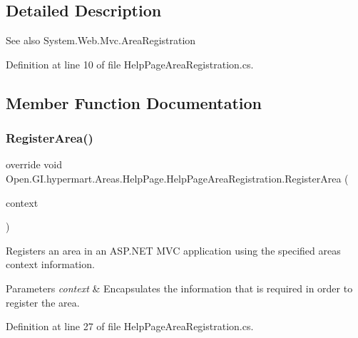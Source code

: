 \subsection{Detailed Description}


\begin{DoxySeeAlso}{See also}
System.\+Web.\+Mvc.\+Area\+Registration


\end{DoxySeeAlso}


Definition at line 10 of file Help\+Page\+Area\+Registration.\+cs.



\subsection{Member Function Documentation}
\mbox{\label{class_open_1_1_g_i_1_1hypermart_1_1_areas_1_1_help_page_1_1_help_page_area_registration_aee73751274402f096ce32ee010ef1a11}} 
\subsubsection{Register\+Area()}
{\footnotesize\ttfamily override void Open.\+G\+I.\+hypermart.\+Areas.\+Help\+Page.\+Help\+Page\+Area\+Registration.\+Register\+Area (\begin{DoxyParamCaption}\item[{Area\+Registration\+Context}]{context }\end{DoxyParamCaption})}



Registers an area in an A\+S\+P.\+N\+ET M\+VC application using the specified area\textquotesingle{}s context information. 


\begin{DoxyParams}{Parameters}
{\em context} & Encapsulates the information that is required in order to register the area.\\
\hline
\end{DoxyParams}


Definition at line 27 of file Help\+Page\+Area\+Registration.\+cs.



